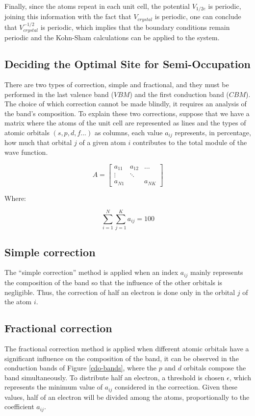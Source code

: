 Finally, since the atoms repeat in each unit cell, the potential $V_{1/2e}$ is periodic, joining this information with the fact that $V_{crystal}$ is periodic, one can conclude that $V_{crystal}^{-1/2}$ is periodic, which implies that the boundary conditions remain periodic and the Kohn-Sham calculations can be applied to the system. 


\subsection{Deciding the Optimal Site for Semi-Occupation} 

There are two types of correction, simple and fractional, and they must be performed in the last valence band ($VBM$) and the first conduction band ($CBM$). The choice of which correction cannot be made blindly, it requires an analysis of the band's composition. To explain these two corrections, suppose that we have a matrix where the atoms 
of the unit cell are represented as lines and the types of atomic orbitals $(s, p, d, f ...)$ as columns, each value $a_{ij}$  represents, in percentage, how much that orbital $j$ of a given atom $i$ contributes to the total module of the wave function. 

\begin{equation}
    A = \begin{bmatrix} 
   a_{11} & a_{12} & \dots \\
   \vdots & \ddots & \\
   a_{N1} &        & a_{NK} 
   \end{bmatrix}
\end{equation}

Where:

\begin{equation}
\sum_{i=1}^{N} \sum_{j=1}^{K} a_{ij} = 100    
\end{equation}
   


\subsection{Simple correction}
The ``simple correction'' method is applied when an index $a_{ij}$ mainly represents the
composition of the band so that the influence of the other orbitals is negligible.
Thus, the correction of half an electron is done only in the orbital $j$ of the atom $i$. 


\subsection{Fractional correction}
The fractional correction method is applied when different atomic orbitals have a significant influence
on the composition of the band, it can be observed in the conduction bands of Figure \ref{cdo-bands}, where the $p$ and $d$ orbitals compose the band simultaneously. To distribute half an  electron, a threshold is chosen
$\epsilon$, which represents the minimum value of $a_{ij}$ considered in the correction. Given these
values, half of an electron will be divided among the atoms, proportionally to the coefficient $a_{ij}$.

